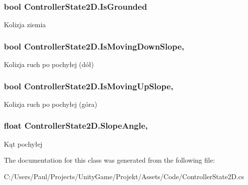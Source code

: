 \subsubsection[{Is\+Grounded}]{\setlength{\rightskip}{0pt plus 5cm}bool Controller\+State2\+D.\+Is\+Grounded\hspace{0.3cm}{\ttfamily [get]}}\label{class_controller_state2_d_a895b129b6c8f95dd3aef68d9342a14d8}


Kolizja ziemia 

\hypertarget{class_controller_state2_d_a813f7c0a080a2b3f784751bb4fa63057}{}
\subsubsection[{Is\+Moving\+Down\+Slope}]{\setlength{\rightskip}{0pt plus 5cm}bool Controller\+State2\+D.\+Is\+Moving\+Down\+Slope\hspace{0.3cm}{\ttfamily [get]}, {\ttfamily [set]}}\label{class_controller_state2_d_a813f7c0a080a2b3f784751bb4fa63057}


Kolizja ruch po pochyłej (dół) 

\hypertarget{class_controller_state2_d_ace3f85ee5879533e319143ee09b16f91}{}
\subsubsection[{Is\+Moving\+Up\+Slope}]{\setlength{\rightskip}{0pt plus 5cm}bool Controller\+State2\+D.\+Is\+Moving\+Up\+Slope\hspace{0.3cm}{\ttfamily [get]}, {\ttfamily [set]}}\label{class_controller_state2_d_ace3f85ee5879533e319143ee09b16f91}


Kolizja ruch po pochyłej (góra) 

\hypertarget{class_controller_state2_d_a724ea7c59fdf1d3c6f1e8fa80998651a}{}
\subsubsection[{Slope\+Angle}]{\setlength{\rightskip}{0pt plus 5cm}float Controller\+State2\+D.\+Slope\+Angle\hspace{0.3cm}{\ttfamily [get]}, {\ttfamily [set]}}\label{class_controller_state2_d_a724ea7c59fdf1d3c6f1e8fa80998651a}


Kąt pochyłej 



The documentation for this class was generated from the following file\+:\begin{DoxyCompactItemize}
\item 
C\+:/\+Users/\+Paul/\+Projects/\+Unity\+Game/\+Projekt/\+Assets/\+Code/Controller\+State2\+D.\+cs\end{DoxyCompactItemize}
